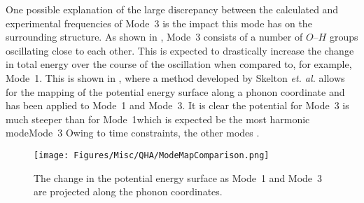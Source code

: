 One possible explanation of the large discrepancy between the calculated and experimental frequencies of Mode~3 is the impact this mode has on the surrounding structure. As shown in , Mode~3 consists of a number of \(O\)\nobreakdash--\(H\) groups oscillating close to each other. This is expected to drastically increase the change in total energy over the course of the oscillation when compared to, for example, Mode~1. This is shown in , where a method developed by Skelton \textit{et. al.} \DIFdelbegin \DIFdel{~}\DIFdelend \cite{Skelton2016} allows for the mapping of the potential energy surface along a phonon coordinate and has been applied to Mode~1 and Mode~3. It is clear the potential for Mode~3 is much steeper than for Mode~1\DIFaddbegin \DIFadd{, }\DIFaddend which is expected \DIFdelbegin {}\DIFdelend \DIFaddbegin {}\DIFaddend be the most harmonic mode\DIFdelbegin {}\DIFdelend \DIFaddbegin {}\DIFaddend Mode~3 \DIFdelbegin {}\DIFdelend \DIFaddbegin {}\DIFaddend Owing to time constraints, \DIFdelbegin {}\DIFdelend the other modes \DIFdelbegin {}\DIFdelend \DIFaddbegin {}\DIFaddend .

\begin{figure}[t]
\centering
\texttt{[image: Figures/Misc/QHA/ModeMapComparison.png]}
\captionsetup{font = footnotesize, justification = centering}
\caption[The Change in the Potential Energy Surface as Mode~1 and Mode~3 are Projected along the Phonon Coordinates]{The change in the potential energy surface as Mode~1 and Mode~3 are projected along the phonon coordinates.}
\label{fig:modemap}
\end{figure}


